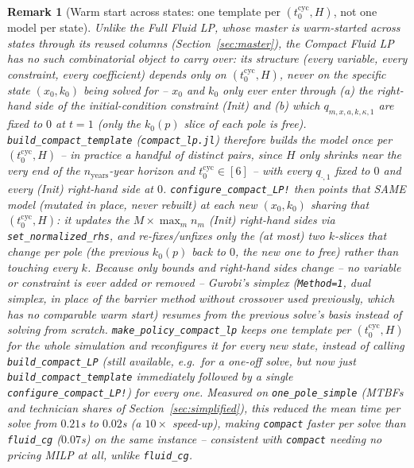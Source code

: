 \documentclass[11pt]{article}
\newtheorem{remark}{Remark}
\begin{document}
\begin{remark}[Warm start across states: one template per $(t_0^{\mathrm{cyc}}, H)$, not one
model per state]
\label{rem:compact-warmstart}
Unlike the Full Fluid LP, whose master is warm-started across states through its reused
\emph{columns} (Section~\ref{sec:master}), the Compact Fluid LP has no such combinatorial
object to carry over: its structure (every variable, every constraint, every coefficient)
depends only on $(t_0^{\mathrm{cyc}}, H)$, never on the specific state $(x_0, k_0)$ being
solved for -- $x_0$ and $k_0$ only ever enter through (a) the right-hand side of the
initial-condition constraint (Init) and (b) which $q_{m,x,a,k,\kappa,1}$ are fixed to $0$ at
$t=1$ (only the $k_0(p)$ slice of each pole is free). \texttt{build\_compact\_template}
(\texttt{compact\_lp.jl}) therefore builds the model once per $(t_0^{\mathrm{cyc}}, H)$ --
in practice a handful of distinct pairs, since $H$ only shrinks near the very end of the
$n_{\mathrm{years}}$-year horizon and $t_0^{\mathrm{cyc}} \in [6]$ -- with every $q_{\cdot,1}$
fixed to $0$ and every (Init) right-hand side at $0$. \texttt{configure\_compact\_LP!} then
points that SAME model (mutated in place, never rebuilt) at each new $(x_0,k_0)$ sharing that
$(t_0^{\mathrm{cyc}}, H)$: it updates the $M \times \max_m n_m$ (Init) right-hand sides via
\texttt{set\_normalized\_rhs}, and re-fixes/unfixes only the (at most) two $k$-slices that
change per pole (the previous $k_0(p)$ back to $0$, the new one to free) rather than
touching every $k$. Because only bounds and right-hand sides change -- no variable or
constraint is ever added or removed -- Gurobi's simplex (\texttt{Method=1}, dual simplex, in
place of the barrier method without crossover used previously, which has no comparable warm
start) resumes from the previous solve's basis instead of solving from scratch.
\texttt{make\_policy\_compact\_lp} keeps one template per $(t_0^{\mathrm{cyc}}, H)$ for the
whole simulation and reconfigures it for every new state, instead of calling
\texttt{build\_compact\_LP} (still available, e.g.\ for a one-off solve, but now just
\texttt{build\_compact\_template} immediately followed by a single
\texttt{configure\_compact\_LP!}) for every one. Measured on \texttt{one\_pole\_simple}
(MTBFs and technician shares of Section~\ref{sec:simplified}), this reduced the mean time
per solve from $0.21$s to $0.02$s (a $10\times$ speed-up), making \texttt{compact} faster
per solve than \texttt{fluid\_cg} ($0.07$s) on the same instance -- consistent with
\texttt{compact} needing no pricing MILP at all, unlike \texttt{fluid\_cg}.
\end{remark}
\end{document}
